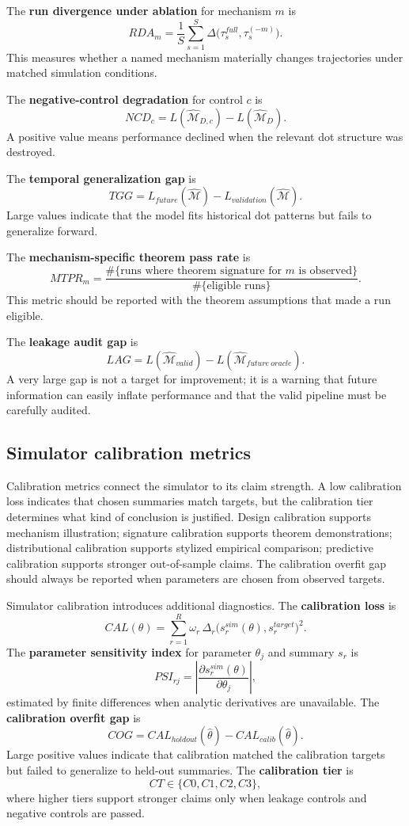 \documentclass[11pt]{article}
\theoremstyle{remark}
\begin{document}
The \textbf{run divergence under ablation} for mechanism \(m\) is
\[
RDA_m=\frac{1}{S}\sum_{s=1}^{S}
\Delta\big(\tau_s^{full},\tau_s^{(-m)}\big).
\]
This measures whether a named mechanism materially changes trajectories under
matched simulation conditions.

The \textbf{negative-control degradation} for control \(c\) is
\[
NCD_c=L(\widehat{\mathcal M}_{D,c})-L(\widehat{\mathcal M}_{D}).
\]
A positive value means performance declined when the relevant dot structure was
destroyed.

The \textbf{temporal generalization gap} is
\[
TGG=L_{future}(\widehat{\mathcal M})-L_{validation}(\widehat{\mathcal M}).
\]
Large values indicate that the model fits historical dot patterns but fails to
generalize forward.

The \textbf{mechanism-specific theorem pass rate} is
\[
MTPR_m=\frac{\#\{\text{runs where theorem signature for }m\text{ is observed}\}}
{\#\{\text{eligible runs}\}}.
\]
This metric should be reported with the theorem assumptions that made a run
eligible.

The \textbf{leakage audit gap} is
\[
LAG=L(\widehat{\mathcal M}_{valid})-L(\widehat{\mathcal M}_{future\ oracle}).
\]
A very large gap is not a target for improvement; it is a warning that future
information can easily inflate performance and that the valid pipeline must be
carefully audited.


\subsection{Simulator calibration metrics}\label{simulator-calibration-metrics}

Calibration metrics connect the simulator to its claim strength. A low calibration loss indicates that chosen summaries match targets, but the calibration tier determines what kind of conclusion is justified. Design calibration supports mechanism illustration; signature calibration supports theorem demonstrations; distributional calibration supports stylized empirical comparison; predictive calibration supports stronger out-of-sample claims. The calibration overfit gap should always be reported when parameters are chosen from observed targets.


Simulator calibration introduces additional diagnostics. The \textbf{calibration loss} is
\[
CAL(\theta)=\sum_{r=1}^{R}\omega_r\,\Delta_r\big(s_r^{sim}(\theta),s_r^{target}\big)^2.
\]
The \textbf{parameter sensitivity index} for parameter $\theta_j$ and summary $s_r$ is
\[
PSI_{rj}=\left|\frac{\partial s_r^{sim}(\theta)}{\partial \theta_j}\right|,
\]
estimated by finite differences when analytic derivatives are unavailable. The \textbf{calibration overfit gap} is
\[
COG=CAL_{holdout}(\widehat\theta)-CAL_{calib}(\widehat\theta).
\]
Large positive values indicate that calibration matched the calibration targets but failed to generalize to held-out summaries. The \textbf{calibration tier} is
\[
CT\in\{C0,C1,C2,C3\},
\]
where higher tiers support stronger claims only when leakage controls and negative controls are passed.
\end{document}

